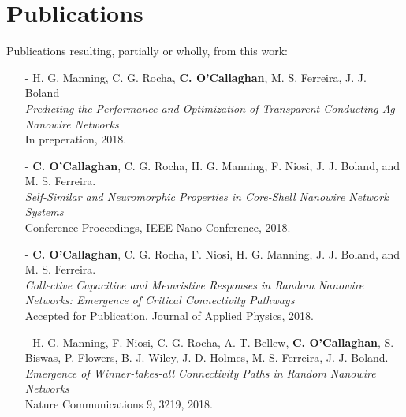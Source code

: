 

\chapter*{Publications} %

Publications resulting, partially or wholly, from this work:
\bigskip

\begin{itemize}
 \item[-] H. G. Manning, C. G. Rocha, \textbf{C. O'Callaghan}, M. S. Ferreira, J. J. Boland \\
 \emph{Predicting the Performance and Optimization of Transparent Conducting Ag Nanowire Networks} \\ 
 In preperation, 2018.
\end{itemize}


\begin{itemize}
 \item[-] \textbf{C. O'Callaghan}, C. G. Rocha, H. G. Manning, F. Niosi, J. J. Boland, and M. S. Ferreira. \\
 \emph{Self-Similar and Neuromorphic Properties in Core-Shell Nanowire Network Systems} \\ 
 Conference Proceedings, IEEE Nano Conference, 2018.
\end{itemize}

\begin{itemize}
 \item[-] \textbf{C. O'Callaghan}, C. G. Rocha, F. Niosi, H. G. Manning, J. J. Boland, and M. S. Ferreira. \\
 \emph{Collective Capacitive and Memristive Responses in Random Nanowire Networks: Emergence of Critical Connectivity Pathways} \\ 
 Accepted for Publication, Journal of Applied Physics, 2018.
\end{itemize}

\begin{itemize}
 \item[-] H. G. Manning, F. Niosi, C. G. Rocha, A. T. Bellew, \textbf{C. O'Callaghan}, S. Biswas, P. Flowers, B. J. Wiley, J. D. Holmes, M. S. Ferreira, J. J. Boland. \\
 \emph{Emergence of Winner-takes-all Connectivity Paths in Random Nanowire Networks} \\ 
Nature Communications 9, 3219, 2018.
\end{itemize}

